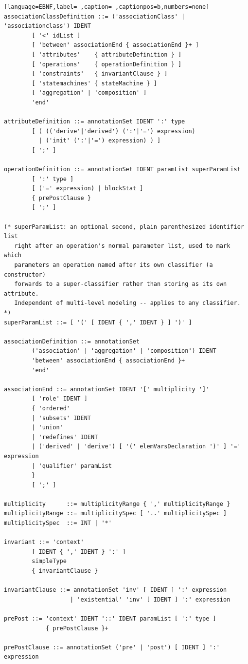 \documentclass[11pt,twoside,a4paper]{book}
\begin{document}
\begin{lstlisting}[language=EBNF,label= ,caption= ,captionpos=b,numbers=none]
associationClassDefinition ::= ('associationClass' | 'associationclass') IDENT
        [ '<' idList ]
        [ 'between' associationEnd { associationEnd }+ ]
        [ 'attributes'    { attributeDefinition } ]
        [ 'operations'    { operationDefinition } ]
        [ 'constraints'   { invariantClause } ]
        [ 'statemachines' { stateMachine } ]
        [ 'aggregation' | 'composition' ]
        'end'

attributeDefinition ::= annotationSet IDENT ':' type
        [ ( (('derive'|'derived') (':'|'=') expression)
          | ('init' (':'|'=') expression) ) ]
        [ ';' ]

operationDefinition ::= annotationSet IDENT paramList superParamList
        [ ':' type ]
        [ ('=' expression) | blockStat ]
        { prePostClause }
        [ ';' ]

(* superParamList: an optional second, plain parenthesized identifier list
   right after an operation's normal parameter list, used to mark which
   parameters an operation named after its own classifier (a constructor)
   forwards to a super-classifier rather than storing as its own attribute.
   Independent of multi-level modeling -- applies to any classifier. *)
superParamList ::= [ '(' [ IDENT { ',' IDENT } ] ')' ]

associationDefinition ::= annotationSet
        ('association' | 'aggregation' | 'composition') IDENT
        'between' associationEnd { associationEnd }+
        'end'

associationEnd ::= annotationSet IDENT '[' multiplicity ']'
        [ 'role' IDENT ]
        { 'ordered'
        | 'subsets' IDENT
        | 'union'
        | 'redefines' IDENT
        | ('derived' | 'derive') [ '(' elemVarsDeclaration ')' ] '=' expression
        | 'qualifier' paramList
        }
        [ ';' ]

multiplicity      ::= multiplicityRange { ',' multiplicityRange }
multiplicityRange ::= multiplicitySpec [ '..' multiplicitySpec ]
multiplicitySpec  ::= INT | '*'

invariant ::= 'context'
        [ IDENT { ',' IDENT } ':' ]
        simpleType
        { invariantClause }

invariantClause ::= annotationSet 'inv' [ IDENT ] ':' expression
                   | 'existential' 'inv' [ IDENT ] ':' expression

prePost ::= 'context' IDENT '::' IDENT paramList [ ':' type ]
            { prePostClause }+

prePostClause ::= annotationSet ('pre' | 'post') [ IDENT ] ':' expression


\end{lstlisting}
\end{document}
